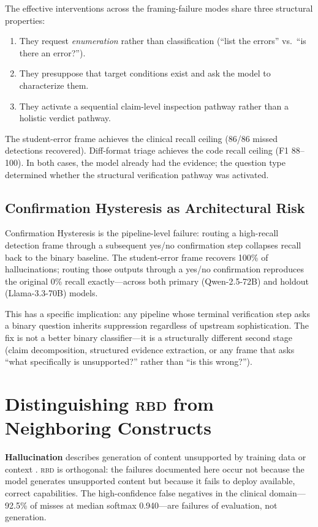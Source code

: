 \documentclass[11pt]{article}
\newcommand{\rbd}{\textsc{rbd}}
\newcommand{\Ch}{Confirmation Hysteresis}
\begin{document}
The effective interventions across the framing-failure modes share three
structural properties:
\begin{enumerate}[leftmargin=*, noitemsep, topsep=2pt]
\item They request \emph{enumeration} rather than classification
(``list the errors'' vs.\ ``is there an error?'').
\item They presuppose that target conditions exist and ask the model
to characterize them.
\item They activate a sequential claim-level inspection pathway rather
than a holistic verdict pathway.
\end{enumerate}

The student-error frame achieves the clinical recall ceiling (86/86
missed detections recovered). Diff-format triage achieves the code
recall ceiling (F1 88--100). In both cases, the model already had the
evidence; the question type determined whether the structural verification
pathway was activated.

\subsection{Confirmation Hysteresis as Architectural Risk}

\Ch{} is the pipeline-level failure: routing a high-recall detection
frame through a subsequent yes/no confirmation step collapses recall
back to the binary baseline. The student-error frame recovers 100\% of
hallucinations; routing those outputs through a yes/no confirmation
reproduces the original 0\% recall exactly---across both primary
(Qwen-2.5-72B) and holdout (Llama-3.3-70B) models.

This has a specific implication: any pipeline whose terminal verification
step asks a binary question inherits suppression regardless of upstream
sophistication. The fix is not a better binary classifier---it is a
structurally different second stage (claim decomposition, structured
evidence extraction, or any frame that asks ``what specifically is
unsupported?'' rather than ``is this wrong?'').

\section{Distinguishing \rbd{} from Neighboring Constructs}
\label{sec:distinguish}

\textbf{Hallucination} describes generation of content unsupported by
training data or context \citep{medhallu2025,factscore2023}. \rbd{} is
orthogonal: the failures documented here occur not because the model
generates unsupported content but because it fails to deploy available,
correct capabilities. The high-confidence false negatives in the clinical
domain---92.5\% of misses at median softmax 0.940---are failures of
evaluation, not generation.
\end{document}
